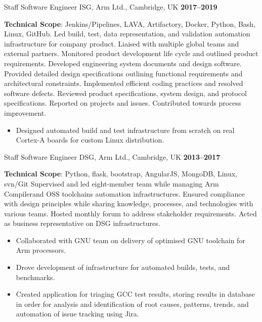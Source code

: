 \documentclass[10pt,a4paper,sans]{moderncv}
\begin{document}
\cventry{}
    {Staff Software Engineer}
    {ISG, Arm Ltd., Cambridge, UK}
    {\textbf{2017--2019}}
    {}
    {\textbf{Technical Scope}: Jenkins/Pipelines, LAVA, Artifactory, Docker,
    Python, Bash, Linux, GitHub.\newline
    Led build, test, data representation, and validation automation
    infrastructure for company product. Liaised with multiple global teams and
    external partners. Monitored product development life cycle and outlined
    product requirements. Developed engineering system documents and design
    software. Provided detailed design specifications outlining functional
    requirements and architectural constraints. Implemented efficient coding
    practices and resolved software defects. Reviewed product specifications,
    system design, and protocol specifications. Reported on projects and
    issues. Contributed towards process improvement.
    \begin{itemize}
        \item Designed automated build and test infrastructure from scratch on
            real Cortex-A boards for custom Linux distribution.
    \end{itemize}}

\cventry{}
    {Staff Software Engineer}
    {DSG, Arm Ltd., Cambridge, UK}
    {\textbf{2013--2017}}
    {}
    {\textbf{Technical Scope}: Python, flask, bootstrap, AngularJS, MongoDB,
    Linux, svn/Git\newline
    Supervised and led eight-member team while managing Arm Compilerand OSS
    toolchains automation infrastructures. Ensured compliance with design
    principles while sharing knowledge, processes, and technologies with
    various teams. Hosted monthly forum to address stakeholder requirements.
    Acted as business representative on DSG infrastructures.
    \begin{itemize}
        \item Collaborated with GNU team on delivery of optimised GNU toolchain
            for Arm processors.
        \item Drove development of infrastructure for automated builds, tests,
            and benchmarks.
        \item Created application for triaging GCC test results, storing
            results in database in order for analysis and identification of
            root causes, patterns, trends, and automation of issue tracking
            using Jira.
    \end{itemize}}
\end{document}
